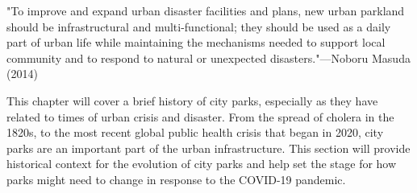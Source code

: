 "To improve and expand urban disaster facilities and plans, new urban parkland should be infrastructural and multi-functional; they should be used as a daily part of urban life while maintaining the mechanisms needed to support local community and to respond to natural or unexpected disasters."---Noboru Masuda (2014)

This chapter will cover a brief history of city parks, especially as they have related to times of urban crisis and disaster. From the spread of cholera in the 1820s, to the most recent global public health crisis that began in 2020, city parks are an important part of the urban infrastructure. This section will provide historical context for the evolution of city parks and help set the stage for how parks might need to change in response to the COVID-19 pandemic.\\
 
